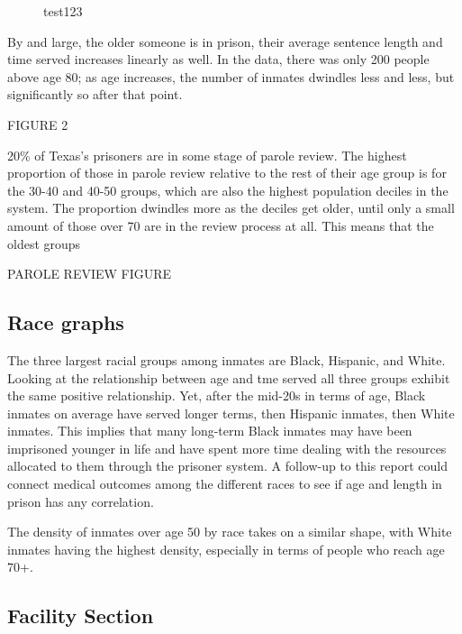 \documentclass[
  letterpaper,
  DIV=11,
  numbers=noendperiod]{scrartcl}
\makeatletter
\newcommand*\pandocbounded[1]{%
  \sbox\pandoc@box{#1}%
  \Gscale@div\@tempa{\textheight}{\dimexpr\ht\pandoc@box+\dp\pandoc@box\relax}%
  \Gscale@div\@tempb{\linewidth}{\wd\pandoc@box}%
  \ifdim\@tempb\p@<\@tempa\p@\let\@tempa\@tempb\fi%
  \ifdim\@tempa\p@<\p@\scalebox{\@tempa}{\usebox\pandoc@box}%
  \else\usebox{\pandoc@box}%
  \fi%
}
\makeatother
\begin{document}
\begin{figure}[H]

{\centering \pandocbounded{}

}

\caption{test123}

\end{figure}%

By and large, the older someone is in prison, their average sentence
length and time served increases linearly as well. In the data, there
was only 200 people above age 80; as age increases, the number of
inmates dwindles less and less, but significantly so after that point.

FIGURE 2

20\% of Texas's prisoners are in some stage of parole review. The
highest proportion of those in parole review relative to the rest of
their age group is for the 30-40 and 40-50 groups, which are also the
highest population deciles in the system. The proportion dwindles more
as the deciles get older, until only a small amount of those over 70 are
in the review process at all. This means that the oldest groups

PAROLE REVIEW FIGURE

\subsection{Race graphs}\label{race-graphs}

The three largest racial groups among inmates are Black, Hispanic, and
White. Looking at the relationship between age and tme served all three
groups exhibit the same positive relationship. Yet, after the mid-20s in
terms of age, Black inmates on average have served longer terms, then
Hispanic inmates, then White inmates. This implies that many long-term
Black inmates may have been imprisoned younger in life and have spent
more time dealing with the resources allocated to them through the
prisoner system. A follow-up to this report could connect medical
outcomes among the different races to see if age and length in prison
has any correlation.

The density of inmates over age 50 by race takes on a similar shape,
with White inmates having the highest density, especially in terms of
people who reach age 70+.

\subsection{Facility Section}\label{facility-section}
\end{document}
